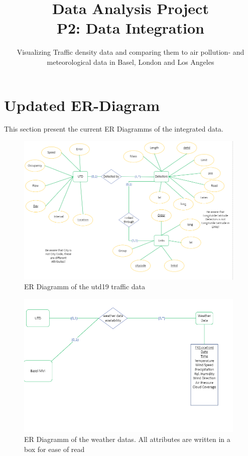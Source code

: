 \documentclass{article}
\title        {Data Analysis Project\\P2: Data Integration}
\subtitle     {Visualizing Traffic density data and comparing them to air pollution- and meteorological data in Basel, London and Los Angeles}
\begin{document}
\printfront


\newpage

\section{Updated ER-Diagram}

This section present the current ER Diagramms of the integrated data.
\begin{figure}[H]
\centering
\includegraphics[width=11cm]{first.png}
\caption{ER Diagramm of the utd19 traffic data}
\end{figure}

\begin{figure}[H]
\centering
\includegraphics[width=11cm]{second.png}
\caption{ER Diagramm of the weather datas. All attributes are written in a box for ease of read}
\end{figure}
\end{document}
